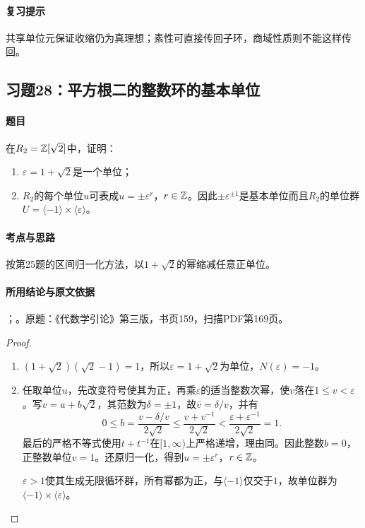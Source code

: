 \paragraph{复习提示}

共享单位元保证收缩仍为真理想；素性可直接传回子环，商域性质则不能这样传回。

\subsection{习题28：平方根二的整数环的基本单位}

\label{ex:4:28}

\paragraph{题目}

在$R_2=\mathbb Z[\sqrt2]$中，证明：
\begin{enumerate}[label=(\roman*)]
\item $\varepsilon=1+\sqrt2$是一个单位；
\item $R_2$的每个单位$u$可表成$u=\pm\varepsilon^r$，$r\in\mathbb Z$。因此$\pm\varepsilon^{\pm1}$是基本单位而且$R_2$的单位群$U=\langle-1\rangle\times\langle\varepsilon\rangle$。
\end{enumerate}

\paragraph{考点与思路}

按第25题的区间归一化方法，以$1+\sqrt2$的幂缩减任意正单位。

\paragraph{所用结论与原文依据}

；。原题：《代数学引论》第三版，书页159，扫描PDF第169页。


\begin{proof}

\begin{enumerate}[label=(\roman*)]
\item $(1+\sqrt2)(\sqrt2-1)=1$，所以$\varepsilon=1+\sqrt2$为单位，$N(\varepsilon)=-1$。
\item 任取单位$u$，先改变符号使其为正，再乘$\varepsilon$的适当整数次幂，使$v$落在$1\le v<\varepsilon$。写$v=a+b\sqrt2$，其范数为$\delta=\pm1$，故$\bar v=\delta/v$，并有
\[
0\le b=\frac{v-\delta/v}{2\sqrt2}
\le\frac{v+v^{-1}}{2\sqrt2}
<\frac{\varepsilon+\varepsilon^{-1}}{2\sqrt2}=1.
\]
最后的严格不等式使用$t+t^{-1}$在$[1,\infty)$上严格递增，理由同。因此整数$b=0$，正整数单位$v=1$。还原归一化，得到$u=\pm\varepsilon^r$，$r\in\mathbb Z$。

$\varepsilon>1$使其生成无限循环群，所有幂都为正，与$\langle-1\rangle$仅交于$1$，故单位群为$\langle-1\rangle\times\langle\varepsilon\rangle$。
\end{enumerate}

\end{proof}

